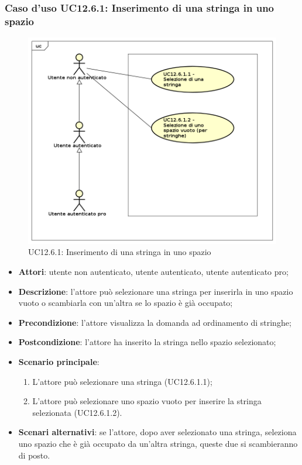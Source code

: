 \subsubsection{Caso d'uso UC12.6.1: Inserimento di una stringa in uno spazio}
\label{UC12.6.1}
\begin{figure}[h]
	\centering
	\includegraphics[scale=0.5]{UML/UC12_6_1.png}
	\caption{UC12.6.1: Inserimento di una stringa in uno spazio}
\end{figure}
\begin{itemize}
\item \textbf{Attori}: utente non autenticato, utente autenticato, utente autenticato pro;
\item \textbf{Descrizione}: l'attore può selezionare una stringa per inserirla in uno spazio vuoto o scambiarla con un'altra se lo spazio è già occupato;
\item \textbf{Precondizione}: l'attore visualizza la domanda ad ordinamento di stringhe;
\item \textbf{Postcondizione}: l'attore ha inserito la stringa nello spazio selezionato;
\item \textbf{Scenario principale}: 
\begin{enumerate}
\item L'attore può selezionare una stringa (UC12.6.1.1);
\item L'attore può selezionare uno spazio vuoto per inserire la stringa selezionata (UC12.6.1.2).
\end{enumerate}
\item \textbf{Scenari alternativi}: se l'attore, dopo aver selezionato una stringa, seleziona uno spazio che è già occupato da un'altra stringa, queste due si scambieranno di posto.
\end{itemize}

